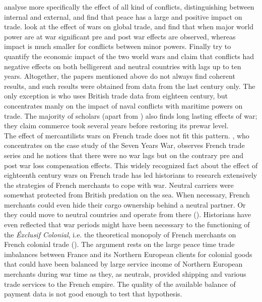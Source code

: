 \documentclass[12pt,a4paper,notitlepage,english]{article}
\begin{document}
\cite{blomberg2006much} analyse more specifically the effect of all kind of conflicts, distinguishing between internal and external, and find that peace has a large and positive impact on trade.
\cite{anderton2001impact} look at the effect of wars on global trade, and find that when major world power are at war significant pre and post war effects are observed, whereas impact is much smaller for conflicts between minor powers.
Finally \cite{glick2010collateral} try to quantify the economic impact of the two world wars and claim that conflicts had negative effects on both belligerent and neutral countries with lags up to ten years.
Altogether, the papers mentioned above do not always find coherent results, and such results were obtained from data from the last century only.
The only exception is \cite{rahman2010fighting} who uses British trade data from eighteen century, but concentrates manly on the impact of naval conflicts with maritime powers on trade.
The majority of scholars (apart from \cite{levy2004trading}) also finds long lasting effects of war; they claim commerce took several years before restoring its prewar level.\\
The effect of mercantilists wars on French trade does not fit this pattern.
\cite{riley_seven_1986}, who concentrates on the case study of the Seven Years War, observes French trade series and he notices that there were no war lags but on the contrary pre and post war loss compensation effects.
This widely recognized fact about the effect of eighteenth century wars on French trade has led historians to research extensively the strategies of French merchants to cope with war.
Neutral carriers were somewhat protected from British predation on the sea.
When necessary, French merchants could even hide their cargo ownership behind a neutral partner.
Or they could move to neutral countries and operate from there (\cite{marzagalli_was_2016}).
Historians have even reflected that war periods might have been necessary to the functioning of the \textit{Éxclusif Colonial}, i.e. the theoretical monopoly of French merchants on French colonial trade (\cite{lespagnol_mondialisation_1997, morineau_vraie_1997, marzagalli_was_2016}).
The argument rests on the large peace time trade imbalances between France and its Northern European clients for colonial goods that could have been balanced by large service income of Northern European merchants during war time as they, as neutrals, provided shipping and various trade services to the French empire.
The quality of the available balance of payment data is not good enough to test that hypothesis.
\end{document}
